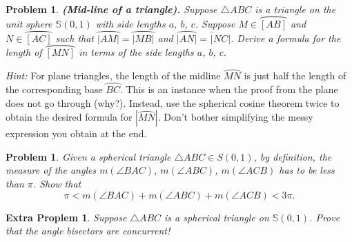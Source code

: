 \documentclass[letter,12pt]{article}
\newtheorem{problem}[main_theorem]{Problem}
\newtheorem{extraproblem}[main_theorem]{Extra Proplem}
\begin{document}
\begin{problem}\textbf{ (Mid-line of a triangle).} Suppose $\triangle ABC$ is a triangle on the unit sphere $\mathbb{S}(0, 1)$ with side lengths $a$, $b$, $c$. Suppose $M \in \wideparen{[AB]}$ and $N \in \wideparen{[AC]}$ such that $\wideparen{|AM|} = \wideparen{|MB|}$ and $\wideparen{|AN|} = \wideparen|NC|$. Derive a formula for the length of $\wideparen{[MN]}$ in terms of the side lengths $a$, $b$, $c$.
\end{problem}
\textit{Hint:} For plane triangles, the length of the midline $\wideparen{MN}$ is just half the length of the corresponding base $\wideparen{BC}$. This is an instance when the proof from the plane does not go through (why?). Instead, use the spherical cosine theorem twice to obtain the desired formula for $|\wideparen{MN}|$. Don't bother simplifying the messy expression you obtain at the end.


\begin{problem}Given a spherical triangle $\triangle ABC \in S(0, 1)$, by definition, the measure of the angles $m(\angle BAC)$, $m(\angle ABC)$, $m(\angle ACB)$ has to be less than $\pi$. Show that $$\pi < m(\angle BAC) + m(\angle ABC) + m(\angle ACB) < 3\pi.$$

\end{problem}

\begin{extraproblem} Suppose $\triangle ABC$ is a spherical triangle on $\mathbb{S}(0, 1)$. Prove that the angle bisectors are concurrent!
\end{extraproblem}
\end{document}
